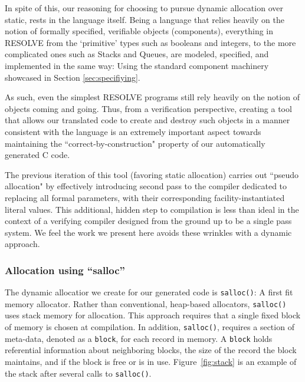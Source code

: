 
In spite of this, our reasoning for choosing to pursue dynamic allocation over static, rests in the language itself. Being a language that relies heavily on the notion of formally specified, verifiable objects (components), everything in RESOLVE from the `primitive' types such as booleans and integers, to the more complicated ones such as Stacks and Queues, are modeled, specified, and implemented in the same way: Using the standard component machinery showcased in Section \ref{sec:specifiying}. 

As such, even the simplest RESOLVE programs still rely heavily on the notion of objects coming and going. Thus, from a verification perspective, creating a tool that allows our translated code to create and destroy such objects in a manner consistent with the language is an extremely important aspect towards maintaining the ``correct-by-construction" property of our automatically generated C code.

The previous iteration of this tool \cite{regula:2010} (favoring static allocation) carries out ``pseudo allocation"  by effectively introducing second pass to the compiler dedicated to replacing all formal parameters, with their corresponding facility-instantiated literal values. This additional, hidden step to compilation is less than ideal in the context of a verifying compiler designed from the ground up to be a single pass system. We feel the work we present here avoids these wrinkles with a dynamic approach.

\subsubsection{Allocation using ``salloc''}

The dynamic allocatior we create for our generated code is \texttt{salloc()}: A first fit memory allocator. Rather than conventional, heap-based allocators, \texttt{salloc()} uses stack memory for allocation. This approach requires that a single fixed block of memory is chosen at compilation. In addition, \texttt{salloc()}, requires a section of meta-data, denoted as a \texttt{block}, for each record in memory. A \texttt{block} holds referential information about neighboring blocks, the size of the record the block maintains, and if the block is free or is in use. Figure~\ref{fig:stack} is an example of the stack after several calls to \texttt{salloc()}.

